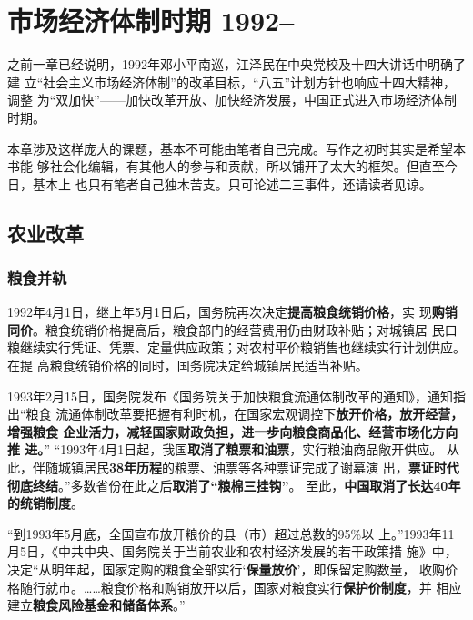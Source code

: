 \chapter{市场经济体制时期 1992--}

之前一章已经说明，1992年邓小平南巡，江泽民在中央党校及十四大讲话中明确了建
立“社会主义市场经济体制”的改革目标，“八五”计划方针也响应十四大精神，调整
为“双加快”——加快改革开放、加快经济发展，中国正式进入市场经济体制时期。

本章涉及这样庞大的课题，基本不可能由笔者自己完成。写作之初时其实是希望本书能
够社会化编辑，有其他人的参与和贡献，所以铺开了太大的框架。但直至今日，基本上
也只有笔者自己独木苦支。只可论述二三事件，还请读者见谅。


\section{农业改革}


\subsection{粮食并轨}

1992年4月1日，继上年5月1日后，国务院再次决定\textbf{提高粮食统销价格}，实
现\textbf{购销同价}。粮食统销价格提高后，粮食部门的经营费用仍由财政补贴；对城镇居
民口粮继续实行凭证、凭票、定量供应政策；对农村平价粮销售也继续实行计划供应。在提
高粮食统销价格的同时，国务院决定给城镇居民适当补贴。

1993年2月15日，国务院发布《国务院关于加快粮食流通体制改革的通知》，通知指出“粮食
流通体制改革要把握有利时机，在国家宏观调控下\textbf{放开价格，放开经营，增强粮食
  企业活力，减轻国家财政负担，进一步向粮食商品化、经营市场化方向推
  进。}” “1993年4月1日起，我国\textbf{取消了粮票和油票}，实行粮油商品敞开供应。
从此，伴随城镇居民\textbf{38年历程}的粮票、油票等各种票证完成了谢幕演
出，\textbf{票证时代彻底终结}。”多数省份在此之后\textbf{取消了“粮棉三挂钩”}。
至此，\textbf{中国取消了长达40年的统销制度}。

“到1993年5月底，全国宣布放开粮价的县（市）超过总数的95\%以
上。”1993年11月5日，《中共中央、国务院关于当前农业和农村经济发展的若干政策措
施》中，决定“从明年起，国家定购的粮食全部实行‘\textbf{保量放价}’，即保留定购数量，
收购价格随行就市。……粮食价格和购销放开以后，国家对粮食实行\textbf{保护价制度}，并
相应建立\textbf{粮食风险基金和储备体系}。”

